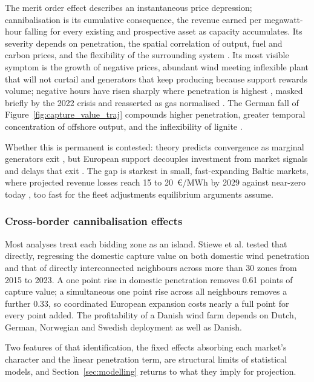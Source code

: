 The merit order effect describes an instantaneous price depression;
cannibalisation is its cumulative consequence, the revenue earned per
megawatt-hour falling for every existing and prospective asset as capacity
accumulates. Its severity depends on penetration, the spatial correlation of
output, fuel and carbon prices, and the flexibility of the surrounding system
\cite{Hirth2013, Stiewe2025}. Its most visible symptom is the growth of negative
prices, abundant wind meeting inflexible plant that will not curtail and
generators that keep producing because support rewards volume; negative hours
have risen sharply where penetration is highest
\cite{Ember2025, EmberGlobal2024}, masked briefly by the 2022 crisis and
reasserted as gas normalised \cite{Ruhnau2023}. The German fall of
Figure~\ref{fig:capture_value_traj} compounds higher penetration, greater temporal
concentration of offshore output, and the inflexibility of lignite
\cite{Monteil2023, Stiewe2025, Ember2025}.

Whether this is permanent is contested: theory predicts convergence as marginal
generators exit \cite{Antweiler2021, Brown2021}, but European support decouples
investment from market signals and delays that exit \cite{Hirth2013}. The gap is
starkest in small, fast-expanding Baltic markets, where projected revenue losses
reach 15 to 20~\euro/MWh by 2029 against near-zero today
\cite{BalticCannibalisation2024_studies}, too fast for the fleet adjustments
equilibrium arguments assume.

\subsubsection{Cross-border cannibalisation effects}

Most analyses treat each bidding zone as an island. Stiewe et al.
\cite{Stiewe2025} tested that directly, regressing the domestic capture value on
both domestic wind penetration and that of directly interconnected neighbours
across more than 30 zones from 2015 to 2023. A one point rise in domestic
penetration removes 0.61 points of capture value; a simultaneous one point rise
across all neighbours removes a further 0.33, so coordinated European expansion
costs nearly a full point for every point added. The profitability of a Danish
wind farm depends on Dutch, German, Norwegian and Swedish deployment as well as
Danish.

Two features of that identification, the fixed effects absorbing each market's
character and the linear penetration term, are structural limits of statistical
models, and Section~\ref{sec:modelling} returns to what they imply for
projection.

